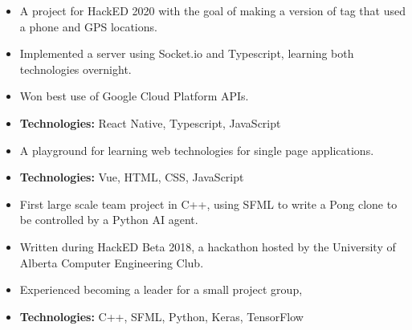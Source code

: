 \documentclass[10pt,letterpaper,ragged2e,academicons]{altacv}
\begin{document}

\begin{fullwidth}
  \makecvheader
\end{fullwidth}




\begin{itemize}
  \item A project for HackED 2020 with the goal of making a version of tag that used a phone and GPS locations.
  \item Implemented a server using Socket.io and Typescript, learning both technologies overnight.
  \item Won best use of Google Cloud Platform APIs.
  \item \textbf{Technologies:} React Native, Typescript, JavaScript
\end{itemize}
\divider\small


\begin{itemize}
  \item A playground for learning web technologies for single page applications.
  \item \textbf{Technologies:} Vue, HTML, CSS, JavaScript
\end{itemize}
\divider\small

\begin{itemize}
  \item First large scale team project in C++, using SFML to write a Pong clone to be controlled by a Python AI agent.
  \item Written during HackED Beta 2018, a hackathon hosted by the University of Alberta Computer Engineering Club.
  \item Experienced becoming a leader for a small project group, 
  \item \textbf{Technologies:} C++, SFML, Python, Keras, TensorFlow
\end{itemize}
\divider\small
\end{document}
